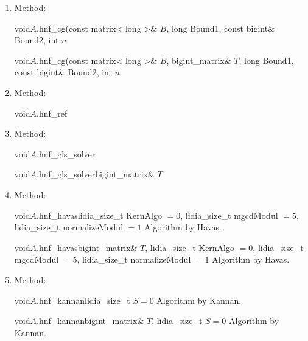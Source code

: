 {\begin{enumerate}
\item Method:

  \begin{fcode}{void}{$A$.hnf_cg}{(const matrix< long >& $B$,
      long Bound1, const bigint& Bound2, int $n$}
  \end{fcode}
  
  \begin{fcode}{void}{$A$.hnf_cg}{(const matrix< long >& $B$, bigint_matrix& $T$,
      long Bound1, const bigint& Bound2, int $n$}
  \end{fcode}
  
\item Method:

  \begin{fcode}{void}{$A$.hnf_ref}{}
  \end{fcode}

\item Method:

  \begin{fcode}{void}{$A$.hnf_gls_solver}{}
  \end{fcode}

  \begin{fcode}{void}{$A$.hnf_gls_solver}{bigint_matrix& $T$}
  \end{fcode}

\item Method:

  \begin{fcode}{void}{$A$.hnf_havas}{lidia_size_t KernAlgo $= 0$, lidia_size_t mgcdModul $= 5$, lidia_size_t normalizeModul $= 1$}
    Algorithm by Havas.
  \end{fcode}

  \begin{fcode}{void}{$A$.hnf_havas}{bigint_matrix& $T$, lidia_size_t KernAlgo $= 0$, lidia_size_t mgcdModul $= 5$, lidia_size_t normalizeModul $= 1$}
    Algorithm by Havas.
  \end{fcode}

\item Method:

  \begin{fcode}{void}{$A$.hnf_kannan}{lidia_size_t $S = 0$}
    Algorithm by Kannan.
  \end{fcode}

  \begin{fcode}{void}{$A$.hnf_kannan}{bigint_matrix& $T$, lidia_size_t $S = 0$}
    Algorithm by Kannan.
  \end{fcode}


\end{enumerate}}
